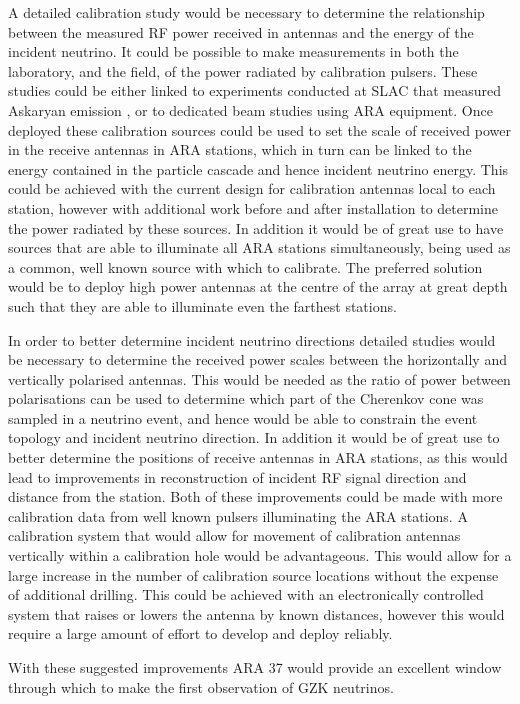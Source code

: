 A detailed calibration study would be necessary to determine the relationship between the measured RF power received in antennas and the energy of the incident neutrino. It could be possible to make measurements in both the laboratory, and the field, of the power radiated by calibration pulsers. These studies could be either linked to experiments conducted at SLAC that measured Askaryan emission \cite{PhysRevLett.99.171101} , or to dedicated beam studies using ARA equipment. Once deployed these calibration sources could be used to set the scale of received power in the receive antennas in ARA stations, which in turn can be linked to the energy contained in the particle cascade and hence incident neutrino energy. This could be achieved with the current design for calibration antennas local to each station, however with additional work before and after installation to determine the power radiated by these sources. In addition it would be of great use to have sources that are able to illuminate all ARA stations simultaneously, being used as a common, well known source with which to calibrate. The preferred solution would be to deploy high power antennas at the centre of the array at great depth such that they are able to illuminate even the farthest stations. 

In order to better determine incident neutrino directions detailed studies would be necessary to determine the received power scales between the horizontally and vertically polarised antennas. This would be needed as the ratio of power between polarisations can be used to determine which part of the Cherenkov cone was sampled in a neutrino event, and hence would be able to constrain the event topology and incident neutrino direction. In addition it would be of great use to better determine the positions of receive antennas in ARA stations, as this would lead to improvements in reconstruction of incident RF signal direction and distance from the station. Both of these improvements could be made with more calibration data from well known pulsers illuminating the ARA stations. A calibration system that would allow for movement of calibration antennas vertically within a calibration hole would be advantageous. This would allow for a large increase in the number of calibration source locations without the expense of additional drilling. This could be achieved with an electronically controlled system that raises or lowers the antenna by known distances, however this would require a large amount of effort to develop and deploy reliably.


With these suggested improvements ARA 37 would provide an excellent window through which to make the first observation of GZK neutrinos.
